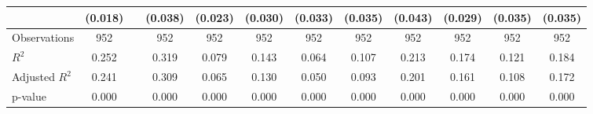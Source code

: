 \begin{table}[htbp]
\begin{tabular}{lccccccccccc}
      & (0.018) &   & (0.038) & (0.023) & (0.030) & (0.033) & (0.035) & (0.043) & (0.029) & (0.035) & (0.035) \\
    \midrule
    Observations & 952 &   & 952 & 952 & 952 & 952 & 952 & 952 & 952 & 952 & 952 \\
    $R^2$ & 0.252 &   & 0.319 & 0.079 & 0.143 & 0.064 & 0.107 & 0.213 & 0.174 & 0.121 & 0.184 \\
    Adjusted $R^2$ & 0.241 &   & 0.309 & 0.065 & 0.130 & 0.050 & 0.093 & 0.201 & 0.161 & 0.108 & 0.172 \\
    p-value & 0.000 &   & 0.000 & 0.000 & 0.000 & 0.000 & 0.000 & 0.000 & 0.000 & 0.000 & 0.000 \\
    \bottomrule
    \end{tabular}%
\end{table}%
